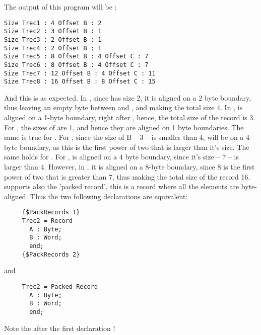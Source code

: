 The output of this program will be :
\begin{verbatim}
Size Trec1 : 4 Offset B : 2
Size Trec2 : 3 Offset B : 1
Size Trec3 : 2 Offset B : 1
Size Trec4 : 2 Offset B : 1
Size Trec5 : 8 Offset B : 4 Offset C : 7
Size Trec6 : 8 Offset B : 4 Offset C : 7
Size Trec7 : 12 Offset B : 4 Offset C : 11
Size Trec8 : 16 Offset B : 8 Offset C : 15
\end{verbatim}
And this is as expected. In , since  has size 2, it is
aligned on a 2 byte boundary, thus leaving an empty byte between 
and , and making the total size 4. In ,  is aligned
on a 1-byte boundary, right after , hence, the total size of the
record is 3.
For , the sizes of  are 1, and hence they are aligned on 1
byte boundaries. The same is true for .
For , since the size of B -- 3 -- is smaller than 4,  will
be on a  4-byte boundary, as this is the first power of two that is
larger than it's size. The same holds for .
For ,  is aligned on a 4 byte boundary, since it's size --
7 -- is larger than 4. However, in , it is aligned on a 8-byte
boundary, since 8 is the first power of two that is greater than 7, thus
making the total size of the record 16.
\fpc supports also the 'packed record', this is a record where all the
elements are byte-aligned.
Thus the two following declarations are equivalent:
\begin{verbatim}
     {$PackRecords 1}
     Trec2 = Record
       A : Byte;
       B : Word;
       end;
     {$PackRecords 2}
\end{verbatim}
and
\begin{verbatim}
     Trec2 = Packed Record
       A : Byte;
       B : Word;
       end;
\end{verbatim}
Note the  after the first declaration !
